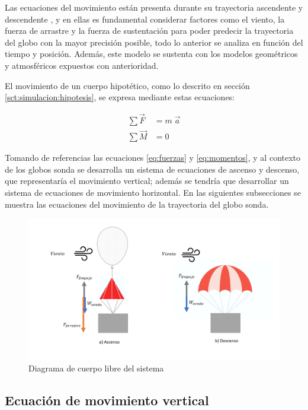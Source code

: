 Las ecuaciones del movimiento están presenta durante su trayectoria ascendente y descendente \cite{libro_fisica_giancoli, libro_dinamica_beer}, y en ellas es fundamental considerar factores como el viento, la fuerza de arrastre y la fuerza de sustentación para poder predecir la trayectoria del globo con la mayor precisión posible, todo lo anterior se analiza en función del tiempo y posición. Además, este modelo se sustenta con los modelos geométricos y atmosféricos expuestos con anterioridad.

El movimiento de un cuerpo hipotético, como lo descrito en sección \ref{sct:simulacion:hipotesis}, se expresa mediante estas ecuaciones:

\begin{align}
    \displaystyle \sum \vec{F} &= m \; \vec{a}  \label{eq:fuerzas}
    \\
    \displaystyle \sum \vec{M} &= 0 \label{eq:momentos}
\end{align}

Tomando de referencias las ecuaciones \ref{eq:fuerzas} y \ref{eq:momentos}, y al contexto de los globos sonda se desarrolla un sistema de ecuaciones de ascenso y descenso, que representaría el movimiento vertical; además se tendría que desarrollar un sistema de ecuaciones de movimiento horizontal. En las siguientes subsecciones se muestra las ecuaciones del movimiento de la trayectoria del globo sonda.

\begin{figure}[h]
    \centering
    \includegraphics[width=0.75\linewidth]{document/figures/02_DCL_movimiento.png}
    \caption{Diagrama de cuerpo libre del sistema}
    \label{fig:dlc}
\end{figure}

\newpage

\subsection{Ecuación de movimiento vertical}

